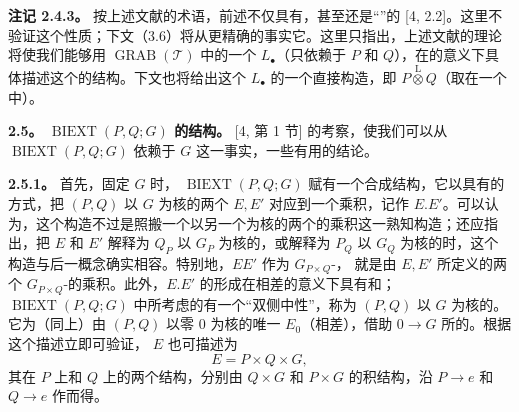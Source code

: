 \textbf{注记 2.4.3。} 按上述文献的术语，前述不仅具有，甚至还是“”的 [4, 2.2]。这里不验证这个性质；下文（3.6）将从更精确的事实它。这里只指出，上述文献的理论将使我们能够用 $\operatorname{GRAB}(\mathcal T)$ 中的一个 $L_\bullet$（只依赖于 $P$ 和 $Q$），在的意义下具体描述这个的结构。下文也将给出这个 $L_\bullet$ 的一个直接构造，即 $P\mathbin{\overset{\mathrm L}{\otimes}}Q$（取在一个中）。

\textbf{2.5。 $\operatorname{BIEXT}(P,Q;G)$ 的结构。} [4, 第 1 节] 的考察，使我们可以从 $\operatorname{BIEXT}(P,Q;G)$ 依赖于 $G$ 这一事实，一些有用的结论。

\textbf{2.5.1。} 首先，固定 $G$ 时， $\operatorname{BIEXT}(P,Q;G)$ 赋有一个合成结构，它以具有的方式，把 $(P,Q)$ 以 $G$ 为核的两个 $E,E'$ 对应到一个乘积，记作 $E.E'$。可以认为，这个构造不过是照搬一个以另一个为核的两个的乘积这一熟知构造；还应指出，把 $E$ 和 $E'$ 解释为 $Q_P$ 以 $G_P$ 为核的，或解释为 $P_Q$ 以 $G_Q$ 为核的时，这个构造与后一概念确实相容。特别地，$EE'$ 作为 $G_{P\times Q}$-，
就是由 $E,E'$ 所定义的两个 $G_{P\times Q}$-的乘积。此外，$E.E'$ 的形成在相差的意义下具有和；$\operatorname{BIEXT}(P,Q;G)$ 中所考虑的有一个“双侧中性”，称为 $(P,Q)$ 以 $G$ 为核的。它为（同上）由 $(P,Q)$ 以零 $0$ 为核的唯一 $E_0$（相差），借助 $0\to G$ 所的。根据这个描述立即可验证， $E$ 也可描述为
\[
E=P\times Q\times G,
\]
其在 $P$ 上和 $Q$ 上的两个结构，分别由 $Q\times G$ 和 $P\times G$ 的积结构，沿 $P\to e$ 和 $Q\to e$ 作而得。

